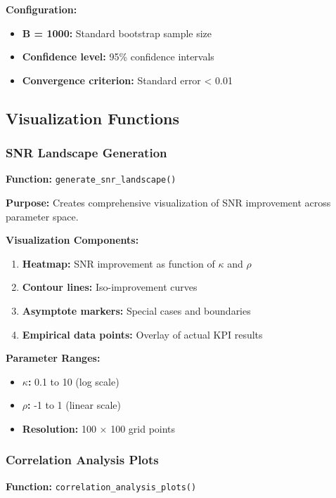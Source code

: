 \textbf{Configuration:}
\begin{itemize}
    \item \textbf{B = 1000:} Standard bootstrap sample size
    \item \textbf{Confidence level:} 95\% confidence intervals
    \item \textbf{Convergence criterion:} Standard error < 0.01
\end{itemize}

\subsection{Visualization Functions}

\subsubsection{SNR Landscape Generation}

\textbf{Function:} \texttt{generate\_snr\_landscape()}

\textbf{Purpose:} Creates comprehensive visualization of SNR improvement across parameter space.

\textbf{Visualization Components:}
\begin{enumerate}
    \item \textbf{Heatmap:} SNR improvement as function of $\kappa$ and $\rho$
    \item \textbf{Contour lines:} Iso-improvement curves
    \item \textbf{Asymptote markers:} Special cases and boundaries
    \item \textbf{Empirical data points:} Overlay of actual KPI results
\end{enumerate}

\textbf{Parameter Ranges:}
\begin{itemize}
    \item \textbf{$\kappa$:} 0.1 to 10 (log scale)
    \item \textbf{$\rho$:} -1 to 1 (linear scale)
    \item \textbf{Resolution:} 100 × 100 grid points
\end{itemize}

\subsubsection{Correlation Analysis Plots}

\textbf{Function:} \texttt{correlation\_analysis\_plots()}

